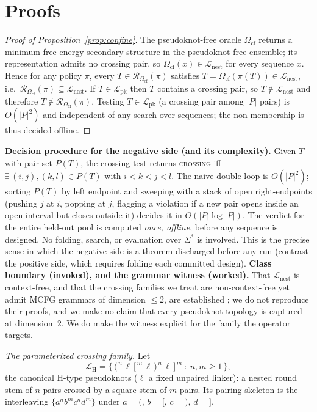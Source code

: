 \documentclass[11pt]{article}
\newcommand{\NESTED}{\ensuremath{\mathcal{L}_{\mathrm{nest}}}}
\newcommand{\PK}{\ensuremath{\mathcal{L}_{\mathrm{pk}}}}
\newcommand{\Ocf}{\ensuremath{\Omega_{\mathrm{cf}}}}
\newcommand{\Rze}[2]{\ensuremath{\mathcal{R}_{#1}(#2)}}
\begin{document}
\appendix
\section{Proofs}\label{app:proofs}
\begin{proof}[Proof of Proposition~\ref{prop:confine}]
The pseudoknot-free oracle \Ocf{} returns a minimum-free-energy secondary structure in the pseudoknot-free
ensemble; its representation admits no crossing pair, so $\Ocf(x)\in\NESTED$ for every sequence $x$. Hence
for any policy $\pi$, every $T\in\Rze{\Ocf}{\pi}$ satisfies $T=\Ocf(\pi(T))\in\NESTED$, i.e.\
$\Rze{\Ocf}{\pi}\subseteq\NESTED$. If $T\in\PK$ then $T$ contains a crossing pair, so $T\notin\NESTED$ and
therefore $T\notin\Rze{\Ocf}{\pi}$. Testing $T\in\PK$ (a crossing pair among $|P|$ pairs) is $O(|P|^2)$ and
independent of any search over sequences; the non-membership is thus decided offline.
\end{proof}

\smallskip\noindent\textbf{Decision procedure for the negative side (and its complexity).} Given $T$ with
pair set $P(T)$, the crossing test returns \textsc{crossing} iff $\exists\,(i,j),(k,l)\in P(T)$ with
$i<k<j<l$. The naive double loop is $O(|P|^2)$; sorting $P(T)$ by left endpoint and sweeping with a stack of
open right-endpoints (pushing $j$ at $i$, popping at $j$, flagging a violation if a new pair opens inside an
open interval but closes outside it) decides it in $O(|P|\log|P|)$. The verdict for the entire held-out pool
is computed \emph{once, offline}, before any sequence is designed. No folding, search, or evaluation over
$\Sigma^\ast$ is involved. This is the precise sense in which the negative side is a theorem discharged
before any run (contrast the positive side, which requires folding each committed design).
\noindent\textbf{Class boundary (invoked), and the grammar witness (worked).} That $\NESTED$ is context-free,
and that the crossing families we treat are non-context-free yet admit MCFG grammars of dimension $\le2$, are
established \citep{rivaseddy2000,nebelweinberg,katosekikasami2006}; we do not reproduce their proofs, and we
make no claim that every pseudoknot topology is captured at dimension~2. We do make the witness explicit for
the family the operator targets.

\smallskip\noindent\emph{The parameterized crossing family.} Let
\begin{equation}\label{eq:family}
  \mathcal L_{\mathrm H}=\bigl\{\,\texttt{(}^{\,n}\,\ell\,\texttt{[}^{\,m}\,\ell\,\texttt{)}^{\,n}\,\ell\,\texttt{]}^{\,m}\ :\ n,m\ge 1\,\bigr\},
\end{equation}
the canonical H-type pseudoknots ($\ell$ a fixed unpaired linker): a nested round stem of $n$ pairs crossed by
a square stem of $m$ pairs. Its pairing skeleton is the interleaving $\{a^{n}b^{m}c^{n}d^{m}\}$ under
$a{=}\texttt{(},\,b{=}\texttt{[},\,c{=}\texttt{)},\,d{=}\texttt{]}$.
\end{document}
